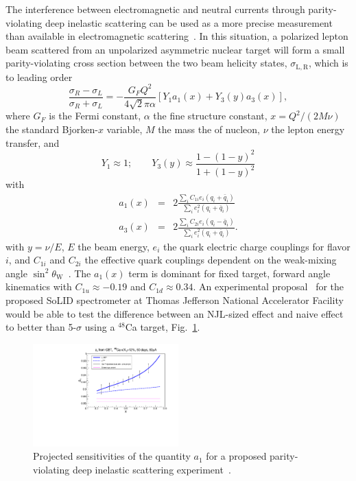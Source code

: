 The interference between electromagnetic and  neutral currents through parity-violating deep inelastic scattering can be used as a more precise measurement than available in electromagnetic scattering~\cite{Cloet:2012td}.  In this situation, a polarized lepton beam scattered from an unpolarized asymmetric nuclear target will form a small parity-violating cross section between the two beam helicity states, $\sigma_{\mathrm{L,R}}$, which is to leading order
\begin{equation}
        \frac{ \sigma_R - \sigma_L }{\sigma_R + \sigma_L} = -\frac{G_F Q^2}{4 \sqrt{2} \pi \alpha} \left[ Y_1 a_1(x) + Y_3(y) a_3(x) \right],
            \label{eq:phy:apv}
\end{equation}
where $G_F$ is the Fermi constant, $\alpha$ the fine structure constant, $x=Q^2/(2M\nu)$ the standard Bjorken-$x$ variable, $M$ the mass the of nucleon, $\nu$ the lepton energy transfer, and
\begin{equation}
        Y_1 \approx 1; \qquad Y_3(y) \approx \frac{1 - (1-y)^2}{1 + (1-y)^2}
    \end{equation}
    with
    \begin{eqnarray}
            a_1(x) & = &  2 \frac{ \sum_i C_{1i} e_i (q_i + \bar{q}_i) }{ \sum_i e_i^2 (q_i + \bar{q}_i) } \\
            a_3(x) & = &  2 \frac{ \sum_i C_{2i} e_i (q_i - \bar{q}_i) }{ \sum_i e_i^2 (q_i + \bar{q}_i) }. 
    \end{eqnarray}
    with $y=\nu/E$,  $E$ the beam energy, $e_i$ the quark electric charge couplings for flavor $i$, and $C_{1i}$ and $C_{2i}$ the effective quark couplings dependent on the weak-mixing angle $\sin^2\theta_\mathrm{W}$~\cite{Patrignani:2016xqp}.  The $a_1(x)$ term is dominant for fixed target, forward angle kinematics with $C_{1u} \approx -0.19$ and $C_{1d} \approx 0.34$.  An experimental proposal~\cite{emcpvdis} for the proposed SoLID spectrometer at Thomas Jefferson National Accelerator Facility would be able to test the difference between an NJL-sized effect and naive effect to better than 5-$\sigma$ using a ${}^{48}$Ca target, Fig.~\ref{fig:ivemc:pvdis}.

    \begin{figure}
        \includegraphics[width=0.5\textwidth]{plots/a1proj_2016.pdf}
        \caption{Projected sensitivities of the quantity $a_1$ for a proposed parity-violating deep inelastic scattering experiment~\cite{emcpvdis}.}
        \label{fig:ivemc:pvdis}
    \end{figure}





